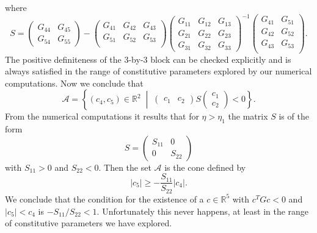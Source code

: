 \documentclass[a4paper,10pt,oneside]{amsbook}
\numberwithin{section}{chapter}
\numberwithin{equation}{chapter}
\theoremstyle{definition}
\begin{document}
where
\[
S=
\begin{pmatrix}
G_{44} & G_{45} \\
G_{54} & G_{55}
\end{pmatrix}-
\begin{pmatrix}
G_{41} & G_{42} & G_{43} \\
G_{51} & G_{52} & G_{53} \\
\end{pmatrix}
\begin{pmatrix}
G_{11} & G_{12} & G_{13} \\
G_{21} & G_{22} & G_{23} \\
G_{31} & G_{32} & G_{33}
\end{pmatrix}^{-1}
\begin{pmatrix}
G_{41} & G_{51} \\
G_{42} & G_{52} \\
G_{43} & G_{53} \\
\end{pmatrix}.
\]
The positive definiteness of the 3-by-3 block can be checked explicitly and is always satisfied in the range of constitutive parameters explored by our numerical computations. Now we conclude that
\[
\mathscr{A}=\left\{(c_4,c_5)\in\mathbb{R}^2\;\middle|\;\begin{pmatrix}
c_1 & c_2
\end{pmatrix}
S
\begin{pmatrix}
c_1 \\ c_2
\end{pmatrix}<0\right\}.
\]
From the numerical computations it results that for $\eta>\eta_1$ the matrix $S$ is of the form
\[
S=\begin{pmatrix}
S_{11} & 0 \\
0 & S_{22}
\end{pmatrix}
\]
with $S_{11}>0$ and $S_{22}<0$. Then the set $\mathscr{A}$ is the cone defined by
\[
|c_5|\ge-\frac{S_{11}}{S_{22}}|c_4|.
\] 
We conclude that the condition for the existence of a $c\in\mathbb{R}^5$ with $c^TGc<0$ and $|c_5|<c_4$ is $-S_{11}/S_{22}<1$. Unfortunately this never happens, at least in the range of constitutive parameters we have explored.
\end{document}
